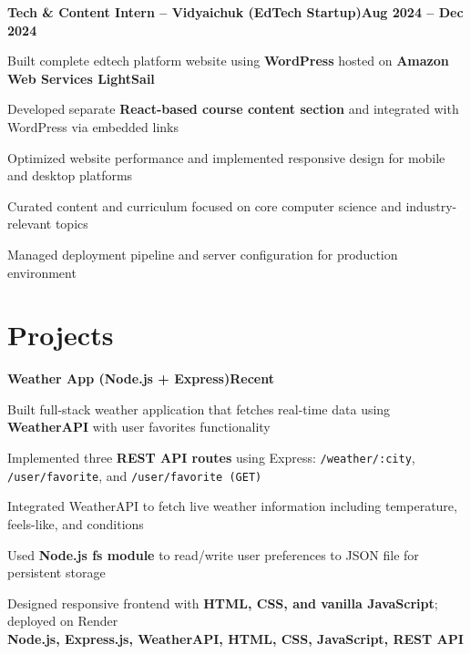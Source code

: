 \documentclass[letterpaper,10pt]{article}
\newcommand{\heading}[2]{
  \hspace{10pt}#1\hfill#2\\
}
\newcommand{\headingBf}[2]{
  \heading{\textbf{#1}}{\textbf{#2}}
}
\newenvironment{resume_list}{
  \vspace{-7pt}
  \begin{itemize}[itemsep=-2px, parsep=1pt, leftmargin=30pt]
}{
  \end{itemize}
}
\begin{document}
  \headingBf{Tech \& Content Intern -- Vidyaichuk (EdTech Startup)}{Aug 2024 -- Dec 2024}
  \begin{resume_list}
    \item Built complete edtech platform website using \textbf{WordPress} hosted on \textbf{Amazon Web Services LightSail}
    \item Developed separate \textbf{React-based course content section} and integrated with WordPress via embedded links
    \item Optimized website performance and implemented responsive design for mobile and desktop platforms
    \item Curated content and curriculum focused on core computer science and industry-relevant topics
    \item Managed deployment pipeline and server configuration for production environment
  \end{resume_list}


  \section{Projects}

  \headingBf{Weather App (Node.js + Express)}{Recent}
  \begin{resume_list}
    \item Built full-stack weather application that fetches real-time data using \textbf{WeatherAPI} with user favorites functionality
    \item Implemented three \textbf{REST API routes} using Express: \texttt{/weather/:city}, \texttt{/user/favorite}, and \texttt{/user/favorite (GET)}
    \item Integrated WeatherAPI to fetch live weather information including temperature, feels-like, and conditions
    \item Used \textbf{Node.js fs module} to read/write user preferences to JSON file for persistent storage
    \item Designed responsive frontend with \textbf{HTML, CSS, and vanilla JavaScript}; deployed on Render
    \\
    \textbf{Node.js, Express.js, WeatherAPI, HTML, CSS, JavaScript, REST API}
  \end{resume_list}
\end{document}
